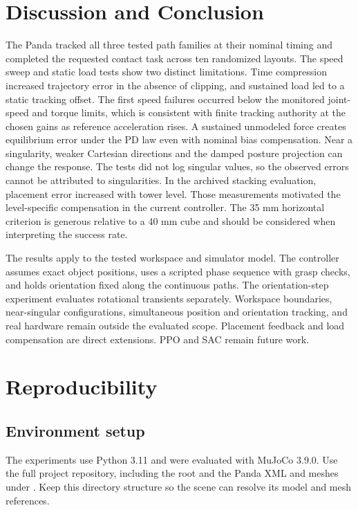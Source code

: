 \documentclass[12pt,a4paper]{article}
\begin{document}
\section{Discussion and Conclusion}
The Panda tracked all three tested path families at their nominal timing and completed the requested contact task across ten randomized layouts. The speed sweep and static load tests show two distinct limitations. Time compression increased trajectory error in the absence of clipping, and sustained load led to a static tracking offset. The first speed failures occurred below the monitored joint-speed and torque limits, which is consistent with finite tracking authority at the chosen gains as reference acceleration rises. A sustained unmodeled force creates equilibrium error under the PD law even with nominal bias compensation. Near a singularity, weaker Cartesian directions and the damped posture projection can change the response. The tests did not log singular values, so the observed errors cannot be attributed to singularities. In the archived stacking evaluation, placement error increased with tower level. Those measurements motivated the level-specific compensation in the current controller. The 35 mm horizontal criterion is generous relative to a 40 mm cube and should be considered when interpreting the success rate.

The results apply to the tested workspace and simulator model. The controller assumes exact object positions, uses a scripted phase sequence with grasp checks, and holds orientation fixed along the continuous paths. The orientation-step experiment evaluates rotational transients separately. Workspace boundaries, near-singular configurations, simultaneous position and orientation tracking, and real hardware remain outside the evaluated scope. Placement feedback and load compensation are direct extensions. PPO and SAC remain future work.

\section*{Reproducibility}
\subsection*{Environment setup}
The experiments use Python 3.11 and were evaluated with MuJoCo 3.9.0. Use the full project repository, including the root  and the Panda XML and meshes under . Keep this directory structure so the scene can resolve its model and mesh references.
\end{document}
